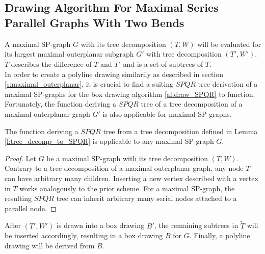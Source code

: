 
\subsection{Drawing Algorithm For Maximal Series Parallel Graphs With Two Bends}

A maximal SP-graph $G$ with its tree decomposition $(T,W)$ will be evaluated for its largest maximal outerplanar subgraph $G'$ with tree decomposition $(T',W')$. $\tilde{T}$ describes the difference of $T$ and $T'$ and is a set of subtrees of $T$.\\
In order to create a polyline drawing similarily as described in section \ref{s:maximal_outerplanar}, it is crucial to find a suiting $SPQR$ tree derivation of a maximal SP-graphs for the box drawing algorithm \ref{al:draw_SPQR} to function. Fortunately, the function deriving a $SPQR$ tree of a tree decomposition of a maximal outerplanar graph $G'$ is also applicable for maximal SP-graphs.
\begin{lemma}
	The function deriving a $SPQR$ tree from a tree decomposition defined in Lemma \ref{l:tree_decomp_to_SPQR} is applicable to any maximal SP-graph $G$.
\end{lemma}
\begin{proof}
	Let $G$ be a maximal SP-graph with its tree decomposition $(T,W)$. Contrary to a tree decomposition of a maximal outerplanar graph, any node $T$ can have arbitrary many children. Inserting a new vertex described with a vertex in $T$ works analogously to the prior scheme. For a maximal SP-graph, the resulting $SPQR$ tree can inherit arbitrary many serial nodes attached to a parallel node.
\end{proof}

After $(T',W')$ is drawn into a box drawing $B'$, the remaining subtrees in $\tilde{T}$ will be inserted accordingly, resulting in a box drawing $B$ for $G$. Finally, a polyline drawing will be derived from $B$.

